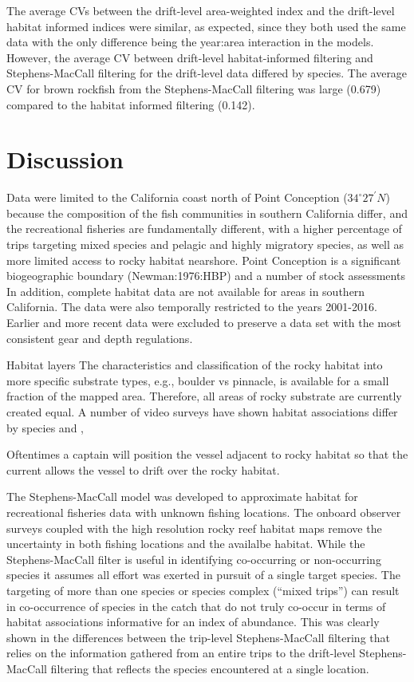 \documentclass[
  12pt,
  authoryear,
  preprint,
  3p]{elsarticle}
\begin{document}
The average CVs between the drift-level area-weighted index and the
drift-level habitat informed indices were similar, as expected, since
they both used the same data with the only difference being the
year:area interaction in the models. However, the average CV between
drift-level habitat-informed filtering and Stephens-MacCall filtering
for the drift-level data differed by species. The average CV for brown
rockfish from the Stephens-MacCall filtering was large (0.679) compared
to the habitat informed filtering (0.142).

\FloatBarrier

\hypertarget{discussion}{%
\section{Discussion}\label{discussion}}

Data were limited to the California coast north of Point Conception
(\(34^\circ 27^\prime N\)) because the composition of the fish
communities in southern California differ, and the recreational
fisheries are fundamentally different, with a higher percentage of trips
targeting mixed species and pelagic and highly migratory species, as
well as more limited access to rocky habitat nearshore. Point Conception
is a significant biogeographic boundary (Newman:1976:HBP) and a number
of stock assessments In addition, complete habitat data are not
available for areas in southern California. The data were also
temporally restricted to the years 2001-2016. Earlier and more recent
data were excluded to preserve a data set with the most consistent gear
and depth regulations.

Habitat layers The characteristics and classification of the rocky
habitat into more specific substrate types, e.g., boulder vs pinnacle,
is available for a small fraction of the mapped area. Therefore, all
areas of rocky substrate are currently created equal. A number of video
surveys have shown habitat associations differ by species and ,

Oftentimes a captain will position the vessel adjacent to rocky habitat
so that the current allows the vessel to drift over the rocky habitat.

The Stephens-MacCall model was developed to approximate habitat for
recreational fisheries data with unknown fishing locations. The onboard
observer surveys coupled with the high resolution rocky reef habitat
maps remove the uncertainty in both fishing locations and the availalbe
habitat. While the Stephens-MacCall filter is useful in identifying
co-occurring or non-occurring species it assumes all effort was exerted
in pursuit of a single target species. The targeting of more than one
species or species complex (``mixed trips'') can result in co-occurrence
of species in the catch that do not truly co-occur in terms of habitat
associations informative for an index of abundance. This was clearly
shown in the differences between the trip-level Stephens-MacCall
filtering that relies on the information gathered from an entire trips
to the drift-level Stephens-MacCall filtering that reflects the species
encountered at a single location.
\end{document}
